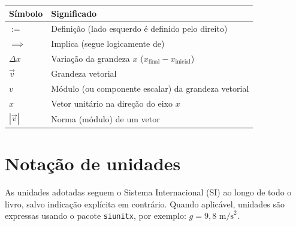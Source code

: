 \begin{center}
\renewcommand{\arraystretch}{1.4}
\begin{tabular}{>{\centering\arraybackslash}p{3cm} l}
\toprule
\textbf{Símbolo} & \textbf{Significado} \\
\midrule
$:=$           & Definição (lado esquerdo é definido pelo direito) \\
$\implies$     & Implica (segue logicamente de) \\
$\Delta x$     & Variação da grandeza $x$ ($x_{\text{final}} - x_{\text{inicial}}$) \\
$\vec{v}$      & Grandeza vetorial \\
$v$            & Módulo (ou componente escalar) da grandeza vetorial \\
$\hat{x}$      & Vetor unitário na direção do eixo $x$ \\
$|\vec{v}|$    & Norma (módulo) de um vetor \\
\bottomrule
\end{tabular}
\end{center}

\section*{Notação de unidades}

As unidades adotadas seguem o Sistema Internacional (SI) ao longo de
todo o livro, salvo indicação explícita em contrário. Quando aplicável,
unidades são expressas usando o pacote \texttt{siunitx}, por exemplo:
$g = 9{,}8 \text{ m/s}^2$.

\clearpage
